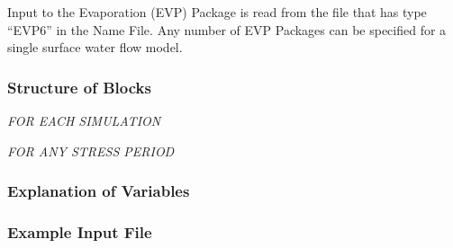 Input to the Evaporation (EVP) Package is read from the file that has type ``EVP6'' in the Name File.  Any number of EVP Packages can be specified for a single surface water flow model.

\vspace{5mm}
\subsubsection{Structure of Blocks}
\vspace{5mm}

\noindent \textit{FOR EACH SIMULATION}


\vspace{5mm}
\noindent \textit{FOR ANY STRESS PERIOD}

\packageperioddescription

\vspace{5mm}
\subsubsection{Explanation of Variables}
\begin{description}

\end{description}

\vspace{5mm}
\subsubsection{Example Input File}



